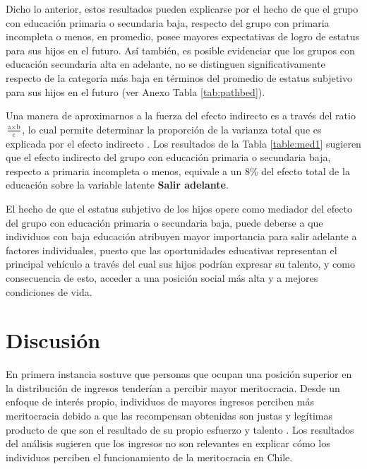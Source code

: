 \documentclass[12pt]{article}
\begin{document}
%



Dicho lo anterior, estos resultados pueden explicarse por el hecho de que el grupo con educación primaria o secundaria baja, respecto del grupo con primaria incompleta o menos, en promedio, posee mayores expectativas de logro de estatus para sus hijos en el futuro. Así también, es posible evidenciar que los grupos con educación secundaria alta en adelante, no se distinguen significativamente respecto de la categoría más baja en términos del promedio de estatus subjetivo para sus hijos en el futuro (ver Anexo Tabla \ref{tab:pathbed}). 

Una manera de aproximarnos a la fuerza del efecto indirecto es a través del ratio $\frac{\text{a} \times \text{b}}{\text{c}}$, lo cual permite determinar la proporción de la varianza total que es explicada por el efecto indirecto \citep{Jose2013}. Los resultados de la Tabla \ref{table:med1} sugieren que el efecto indirecto del grupo con educación primaria o secundaria baja, respecto a primaria incompleta o menos,  equivale a un 8\% del efecto total de la educación sobre la variable latente \textbf{Salir adelante}.

El hecho de que el estatus subjetivo de los hijos opere como mediador del efecto del grupo con educación primaria o secundaria baja, puede deberse a que individuos con baja educación atribuyen mayor importancia para salir adelante a factores individuales, puesto que las oportunidades educativas representan el principal vehículo a través del cual sus hijos podrían expresar su talento, y como consecuencia de esto, acceder a una posición social más alta y a mejores condiciones de vida. 

\newpage

\section{Discusión}

En primera instancia sostuve que personas que ocupan una posición superior en la distribución de ingresos tenderían a percibir mayor meritocracia. Desde un enfoque de interés propio, individuos de mayores ingresos perciben más meritocracia debido a que las recompensan obtenidas son justas y legítimas producto de que son el resultado de su propio esfuerzo y talento \citep{Kunovich2007, Duru-bellat2012}. Los resultados del análisis sugieren que los ingresos no son relevantes en explicar cómo los individuos perciben el funcionamiento de la meritocracia en Chile. 
\end{document}
